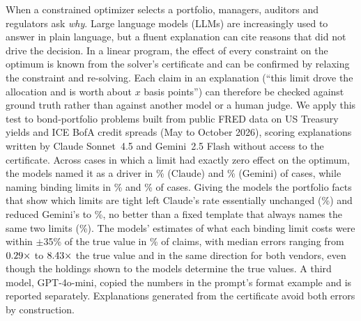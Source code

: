 When a constrained optimizer selects a portfolio, managers, auditors and
regulators ask \emph{why}. Large language models (LLMs) are increasingly used to
answer in plain language, but a fluent explanation can cite reasons that did not
drive the decision. In a linear program, the effect of every constraint on the
optimum is known from the solver's certificate and can be confirmed by relaxing
the constraint and re-solving. Each claim in an explanation (``this limit drove
the allocation and is worth about $x$ basis points'') can therefore be checked
against ground truth rather than against another model or a human judge. We
apply this test to \nProblems{} bond-portfolio problems built from public FRED
data on US Treasury yields and ICE BofA credit spreads (May to October 2026),
scoring explanations written by Claude Sonnet~4.5 and Gemini~2.5 Flash without
access to the certificate. Across \nSlackCases{} cases in which a limit had
exactly zero effect on the optimum, the models named it as a driver in
\snSonFf\% (Claude) and \snGemFf\% (Gemini) of cases, while naming binding limits
in \bindSonFf\% and \bindGemFf\% of cases. Giving the models the portfolio facts
that show which limits are tight left Claude's rate essentially unchanged
(\snSonInf\%) and reduced Gemini's to \snGemInf\%, no better than a fixed template
that always names the same two limits (\snTmpl\%). The models' estimates of what
each binding limit costs were within $\pm$35\% of the true value in \magMain\% of
\nMagMain{} claims, with median errors ranging from $0.29\times$ to
$8.43\times$ the true value and in the same direction for both
vendors, even though the holdings shown to the models determine the true
values. A third model, GPT-4o-mini, copied the numbers in the prompt's format
example and is reported separately. Explanations generated from the
certificate avoid both errors by construction.
